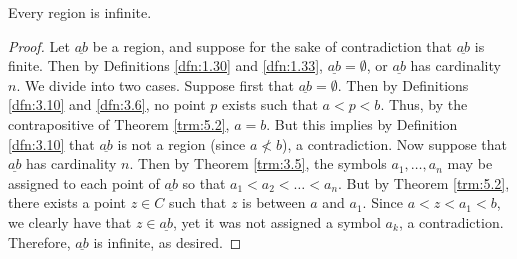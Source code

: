 \documentclass[../main.tex]{subfiles}
\begin{document}
\begin{corollary}\label{cly:5.3}
    Every region is infinite.
    \begin{proof}
        Let $\underline{ab}$ be a region, and suppose for the sake of contradiction that $\underline{ab}$ is finite. Then by Definitions \ref{dfn:1.30} and \ref{dfn:1.33}, $\underline{ab}=\emptyset$, or $\underline{ab}$ has cardinality $n$. We divide into two cases. Suppose first that $\underline{ab}=\emptyset$. Then by Definitions \ref{dfn:3.10} and \ref{dfn:3.6}, no point $p$ exists such that $a<p<b$. Thus, by the contrapositive of Theorem \ref{trm:5.2}, $a=b$. But this implies by Definition \ref{dfn:3.10} that $\underline{ab}$ is not a region (since $a\not<b$), a contradiction. Now suppose that $\underline{ab}$ has cardinality $n$. Then by Theorem \ref{trm:3.5}, the symbols $a_1,\dots,a_n$ may be assigned to each point of $\underline{ab}$ so that $a_1<a_2<\dots<a_n$. But by Theorem \ref{trm:5.2}, there exists a point $z\in C$ such that $z$ is between $a$ and $a_1$. Since $a<z<a_1<b$, we clearly have that $z\in\underline{ab}$, yet it was not assigned a symbol $a_k$, a contradiction. Therefore, $\underline{ab}$ is infinite, as desired.
    \end{proof}
\end{corollary}
\end{document}

